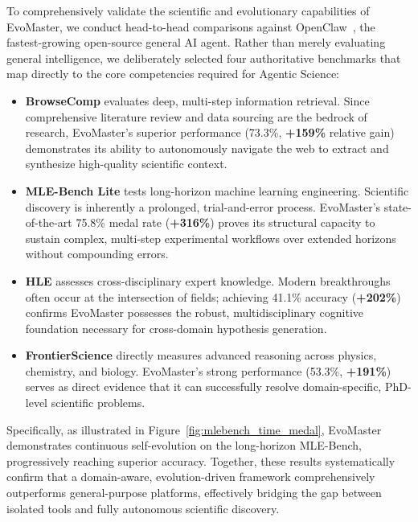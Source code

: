 \documentclass[11pt, a4paper, logo, copyright, nonumbering]{cls/Sci}
\begin{document}
To comprehensively validate the scientific and evolutionary capabilities of EvoMaster, we conduct head-to-head comparisons against OpenClaw~\citep{steinberger2025openclaw}, the fastest-growing open-source general AI agent. Rather than merely evaluating general intelligence, we deliberately selected four authoritative benchmarks that map directly to the core competencies required for Agentic Science:

\begin{itemize}[leftmargin=*, nosep]
\item \textbf{BrowseComp} evaluates deep, multi-step information retrieval. Since comprehensive literature review and data sourcing are the bedrock of research, EvoMaster's superior performance (73.3\%, \textbf{+159\%} relative gain) demonstrates its ability to autonomously navigate the web to extract and synthesize high-quality scientific context.
\item \textbf{MLE-Bench Lite} tests long-horizon machine learning engineering. Scientific discovery is inherently a prolonged, trial-and-error process. EvoMaster's state-of-the-art 75.8\% medal rate (\textbf{+316\%}) proves its structural capacity to sustain complex, multi-step experimental workflows over extended horizons without compounding errors.
\item \textbf{HLE} assesses cross-disciplinary expert knowledge. Modern breakthroughs often occur at the intersection of fields; achieving 41.1\% accuracy (\textbf{+202\%}) confirms EvoMaster possesses the robust, multidisciplinary cognitive foundation necessary for cross-domain hypothesis generation.
\item \textbf{FrontierScience} directly measures advanced reasoning across physics, chemistry, and biology. EvoMaster's strong performance (53.3\%, \textbf{+191\%}) serves as direct evidence that it can successfully resolve domain-specific, PhD-level scientific problems.
\end{itemize}

Specifically, as illustrated in Figure~\ref{fig:mlebench_time_medal}, EvoMaster demonstrates continuous self-evolution on the long-horizon MLE-Bench, progressively reaching superior accuracy. Together, these results systematically confirm that a domain-aware, evolution-driven framework comprehensively outperforms general-purpose platforms, effectively bridging the gap between isolated tools and fully autonomous scientific discovery.
\end{document}
